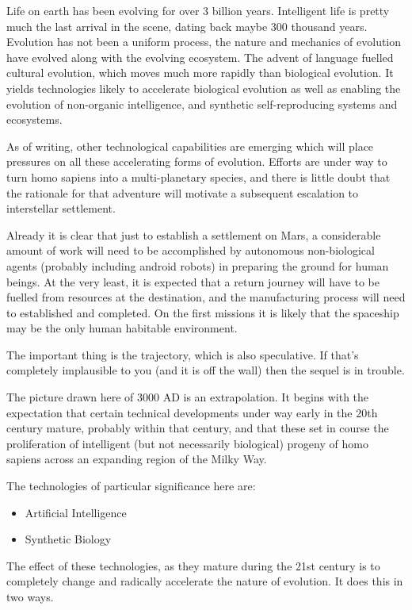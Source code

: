 \documentclass[10pt,titlepage]{book}
\begin{document}
Life on earth has been evolving for over 3 billion years.
Intelligent life is pretty much the last arrival in the scene, dating back maybe 300 thousand years.
Evolution has not been a uniform process, the nature and mechanics of evolution have evolved along with the evolving ecosystem.
The advent of language fuelled cultural evolution, which moves much more rapidly than biological evolution.
It yields technologies likely to accelerate biological evolution as well as enabling the evolution of non-organic intelligence, and synthetic self-reproducing systems and ecosystems.

As of writing, other technological capabilities are emerging which will place pressures on all these accelerating forms of evolution.
Efforts are under way to turn homo sapiens into a multi-planetary species, and there is little doubt that the rationale for that adventure will motivate a subsequent escalation to interstellar settlement.

Already it is clear that just to establish a settlement on Mars, a considerable amount of work will need to be accomplished by autonomous non-biological agents (probably including android robots) in preparing the ground for human beings.
At the very least, it is expected that a return journey will have to be fuelled from resources at the destination, and the manufacturing process will need to established and completed.
On the first missions it is likely that the spaceship may be the only human habitable environment.




The important thing is the trajectory, which is also speculative.
If that's completely implausible to you (and it is off the wall) then the sequel is in trouble.

The picture drawn here of 3000 AD is an extrapolation.
It begins with the expectation that certain technical developments under way early in the 20th century mature, probably within that century, and that these set in course the proliferation of intelligent (but not necessarily biological) progeny of homo sapiens across an expanding region of the Milky Way.

The technologies of particular significance here are:
\begin{itemize}
\item{Artificial Intelligence}
\item{Synthetic Biology}
\end{itemize}

The effect of these technologies, as they mature during the 21st century is to completely change and radically accelerate the nature of
evolution.
It does this in two ways.
\end{document}
